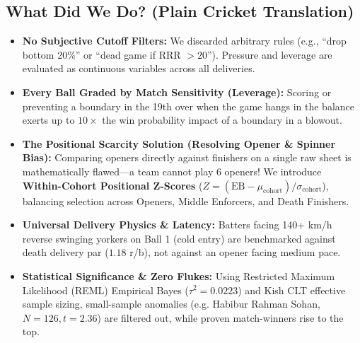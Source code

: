 \documentclass[10pt,a4paper]{article}
\begin{document}
\subsection*{What Did We Do? (Plain Cricket Translation)}
\begin{itemize}[leftmargin=1.2em]
    \item \textbf{No Subjective Cutoff Filters:} We discarded arbitrary rules (e.g., ``drop bottom 20\%'' or ``dead game if RRR $> 20$''). Pressure and leverage are evaluated as continuous variables across all deliveries.
    \item \textbf{Every Ball Graded by Match Sensitivity (Leverage):} Scoring or preventing a boundary in the 19th over when the game hangs in the balance exerts up to $10\times$ the win probability impact of a boundary in a blowout.
    \item \textbf{The Positional Scarcity Solution (Resolving Opener \& Spinner Bias):} Comparing openers directly against finishers on a single raw sheet is mathematically flawed—a team cannot play 6 openers! We introduce \textbf{Within-Cohort Positional Z-Scores} ($Z = (\text{EB} - \mu_{\text{cohort}})/\sigma_{\text{cohort}}$), balancing selection across Openers, Middle Enforcers, and Death Finishers.
    \item \textbf{Universal Delivery Physics \& Latency:} Batters facing 140+ km/h reverse swinging yorkers on Ball 1 (cold entry) are benchmarked against death delivery par ($1.18$ r/b), not against an opener facing medium pace.
    \item \textbf{Statistical Significance \& Zero Flukes:} Using Restricted Maximum Likelihood (REML) Empirical Bayes ($\tau^2 = 0.0223$) and Kish CLT effective sample sizing, small-sample anomalies (e.g. Habibur Rahman Sohan, $N=126, t=2.36$) are filtered out, while proven match-winners rise to the top.
\end{itemize}
\end{document}
